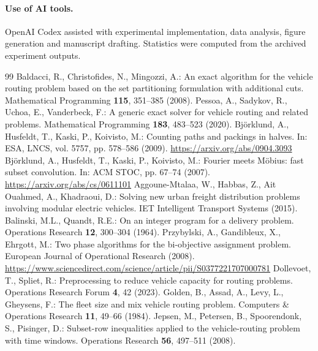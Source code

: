\documentclass[runningheads]{llncs}
\begin{document}
\paragraph{Use of AI tools.}
OpenAI Codex assisted with experimental implementation, data analysis, figure generation and manuscript drafting. Statistics were computed from the archived experiment outputs.

\begin{thebibliography}{99}
 Baldacci, R., Christofides, N., Mingozzi, A.: An exact algorithm for the vehicle routing problem based on the set partitioning formulation with additional cuts. Mathematical Programming \textbf{115}, 351--385 (2008). 
 Pessoa, A., Sadykov, R., Uchoa, E., Vanderbeck, F.: A generic exact solver for vehicle routing and related problems. Mathematical Programming \textbf{183}, 483--523 (2020). 
 Björklund, A., Husfeldt, T., Kaski, P., Koivisto, M.: Counting paths and packings in halves. In: ESA, LNCS, vol. 5757, pp. 578--586 (2009). \url{https://arxiv.org/abs/0904.3093}
 Björklund, A., Husfeldt, T., Kaski, P., Koivisto, M.: Fourier meets Möbius: fast subset convolution. In: ACM STOC, pp. 67--74 (2007). \url{https://arxiv.org/abs/cs/0611101}
 Aggoune-Mtalaa, W., Habbas, Z., Ait Ouahmed, A., Khadraoui, D.: Solving new urban freight distribution problems involving modular electric vehicles. IET Intelligent Transport Systems (2015). 
 Balinski, M.L., Quandt, R.E.: On an integer program for a delivery problem. Operations Research \textbf{12}, 300--304 (1964). 
 Przybylski, A., Gandibleux, X., Ehrgott, M.: Two phase algorithms for the bi-objective assignment problem. European Journal of Operational Research (2008). \url{https://www.sciencedirect.com/science/article/pii/S0377221707000781}
 Dollevoet, T., Spliet, R.: Preprocessing to reduce vehicle capacity for routing problems. Operations Research Forum \textbf{4}, 42 (2023). 
 Golden, B., Assad, A., Levy, L., Gheysens, F.: The fleet size and mix vehicle routing problem. Computers \& Operations Research \textbf{11}, 49--66 (1984). 
 Jepsen, M., Petersen, B., Spoorendonk, S., Pisinger, D.: Subset-row inequalities applied to the vehicle-routing problem with time windows. Operations Research \textbf{56}, 497--511 (2008). 

\end{thebibliography}
\end{document}
